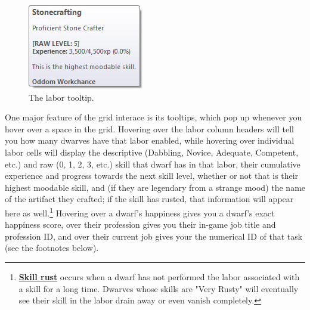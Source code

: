 \documentclass[]{article}
\begin{document}
\begin{figure}
\vspace{-20pt}
  \begin{center}
    \includegraphics{Sec1Fig7}
  \end{center}
\vspace{-10pt}
  \caption{The labor tooltip.}
\end{figure}
One major feature of the grid interace is its tooltips, which pop up whenever you hover over a space in
the grid. Hovering over the labor column headers will tell you how many dwarves have that labor enabled,
while hovering over individual labor cells will display the descriptive (Dabbling, Novice, Adequate,
Competent, etc.) and raw (0, 1, 2, 3, etc.) skill that dwarf has in that labor, their cumulative
experience and progress towards the next skill level, whether or not that is their highest moodable
skill, and (if they are legendary from a strange mood) the name of the artifact they crafted; if the
skill has rusted, that information will appear here as well.\footnote{
\href{http://dwarffortresswiki.org/index.php/DF2012:Skill\#Skill_rust}{\textbf{Skill rust}} occurs when
a dwarf has not performed the labor associated with a skill for a long time. Dwarves whose skills are
"Very Rusty" will eventually see their skill in the labor drain away or even vanish completely.}
Hovering over a dwarf's happiness gives you a dwarf's exact happiness score, over their profession gives
you their in-game job title and profession ID, and over their current job gives your
the numerical ID of that task (see the footnotes below).%
\newpage
\end{document}
